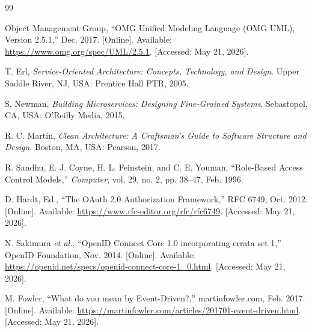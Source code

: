 \begingroup
\setlength{\itemsep}{0pt}
\setlength{\parskip}{0pt}
\setlength{\parsep}{0pt}
\sloppy

\renewcommand{\bibname}{Bibliography}
\begin{thebibliography}{99}

Object Management Group, ``OMG Unified Modeling Language (OMG UML), Version 2.5.1,'' Dec. 2017. [Online]. Available: \url{https://www.omg.org/spec/UML/2.5.1}. [Accessed: May 21, 2026].

T. Erl, \textit{Service-Oriented Architecture: Concepts, Technology, and Design}. Upper Saddle River, NJ, USA: Prentice Hall PTR, 2005.

S. Newman, \textit{Building Microservices: Designing Fine-Grained Systems}. Sebastopol, CA, USA: O'Reilly Media, 2015.

R. C. Martin, \textit{Clean Architecture: A Craftsman's Guide to Software Structure and Design}. Boston, MA, USA: Pearson, 2017.

R. Sandhu, E. J. Coyne, H. L. Feinstein, and C. E. Youman, ``Role-Based Access Control Models,'' \textit{Computer}, vol. 29, no. 2, pp. 38--47, Feb. 1996.

D. Hardt, Ed., ``The OAuth 2.0 Authorization Framework,'' RFC 6749, Oct. 2012. [Online]. Available: \url{https://www.rfc-editor.org/rfc/rfc6749}. [Accessed: May 21, 2026].

N. Sakimura \textit{et al.}, ``OpenID Connect Core 1.0 incorporating errata set 1,'' OpenID Foundation, Nov. 2014. [Online]. Available: \url{https://openid.net/specs/openid-connect-core-1_0.html}. [Accessed: May 21, 2026].

M. Fowler, ``What do you mean by Event-Driven?,'' martinfowler.com, Feb. 2017. [Online]. Available: \url{https://martinfowler.com/articles/201701-event-driven.html}. [Accessed: May 21, 2026].

\end{thebibliography}

